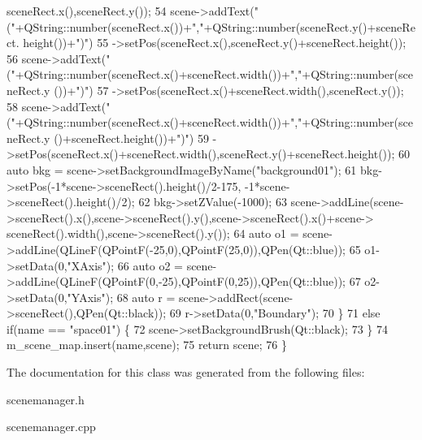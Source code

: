 \begin{DoxyCode}
      sceneRect.x(),sceneRect.y());
54         scene->addText(\textcolor{stringliteral}{"("}+QString::number(sceneRect.x())+\textcolor{stringliteral}{","}+QString::number(sceneRect.y()+sceneRect.
      height())+\textcolor{stringliteral}{")"})
55                       ->setPos(sceneRect.x(),sceneRect.y()+sceneRect.height());
56         scene->addText(\textcolor{stringliteral}{"("}+QString::number(sceneRect.x()+sceneRect.width())+\textcolor{stringliteral}{","}+QString::number(sceneRect.y
      ())+\textcolor{stringliteral}{")"})
57                       ->setPos(sceneRect.x()+sceneRect.width(),sceneRect.y());
58         scene->addText(\textcolor{stringliteral}{"("}+QString::number(sceneRect.x()+sceneRect.width())+\textcolor{stringliteral}{","}+QString::number(sceneRect.y
      ()+sceneRect.height())+\textcolor{stringliteral}{")"})
59                       ->setPos(sceneRect.x()+sceneRect.width(),sceneRect.y()+sceneRect.height());
60         \textcolor{keyword}{auto} bkg = scene->setBackgroundImageByName(\textcolor{stringliteral}{"background01"});
61         bkg->setPos(-1*scene->sceneRect().height()/2-175, -1*scene->sceneRect().height()/2);
62         bkg->setZValue(-1000);
63         scene->addLine(scene->sceneRect().x(),scene->sceneRect().y(),scene->sceneRect().x()+scene->
      sceneRect().width(),scene->sceneRect().y());
64         \textcolor{keyword}{auto} o1 = scene->addLine(QLineF(QPointF(-25,0),QPointF(25,0)),QPen(Qt::blue));
65         o1->setData(0,\textcolor{stringliteral}{"XAxis"});
66         \textcolor{keyword}{auto} o2 = scene->addLine(QLineF(QPointF(0,-25),QPointF(0,25)),QPen(Qt::blue));
67         o2->setData(0,\textcolor{stringliteral}{"YAxis"});
68         \textcolor{keyword}{auto} r = scene->addRect(scene->sceneRect(),QPen(Qt::black));
69         r->setData(0,\textcolor{stringliteral}{"Boundary"});
70     \}
71     \textcolor{keywordflow}{else} \textcolor{keywordflow}{if}(name == \textcolor{stringliteral}{"space01"}) \{
72         scene->setBackgroundBrush(Qt::black);
73     \}
74     m\_scene\_map.insert(name,scene);
75     \textcolor{keywordflow}{return} scene;
76 \}
\end{DoxyCode}


The documentation for this class was generated from the following files\+:\begin{DoxyCompactItemize}
\item 
scenemanager.\+h\item 
scenemanager.\+cpp\end{DoxyCompactItemize}
